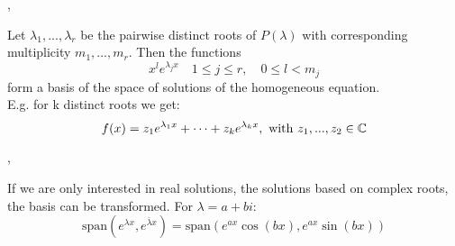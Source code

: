 \sep

\Theorem Let $\lambda_1, ..., \lambda_r$ be the pairwise distinct roots of $P(\lambda)$ with corresponding multiplicity $m_1, ..., m_r$.
Then the functions
$$x^{l}  e^{\lambda_j x} \quad 1 \leq j \leq r, \quad 0 \leq l < m_j$$
form a basis of the space of solutions of the homogeneous equation. \\
E.g. for k distinct roots we get:
$$ f(x) = z_1 e^{\lambda_1 x} + \cdots + z_k e^{\lambda_k x}, \text{ with }  z_1, ..., z_2 \in \mathbb{C} $$

\sep

\Remark If we are only interested in real solutions, the solutions based on complex roots, the basis can be transformed. For $\lambda=a + b i$:
$$ \text{span}(e^{\lambda x}, e^{\bar{\lambda}x}) =
   \text{span}(e^{a x} \cos{(b x)}, e^{a x} \sin{(b x)})$$
   
